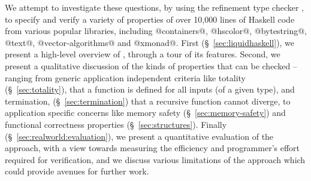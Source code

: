 We attempt to investigate these questions, by using the
refinement type checker \toolname, to specify and verify a variety of 
properties of over 10,000 lines of Haskell code from various popular 
libraries, including @containers@, \hbox{@hscolor@,} @bytestring@, @text@, 
@vector-algorithms@ and @xmonad@. 
%
First (\S~\ref{sec:liquidhaskell}), 
we present a high-level overview of \toolname, through a tour 
of its features.
%
Second, we present a qualitative discussion of the kinds of properties
that can be checked -- ranging from generic application independent 
criteria like totality (\S~\ref{sec:totality}), 
\ie that a function is defined for all inputs (of a given type),  
and termination, 
(\S~\ref{sec:termination}) 
\ie that a recursive function cannot diverge,
to application specific concerns like memory safety (\S~\ref{sec:memory-safety}) 
and functional correctness properties (\S~\ref{sec:structures}).
%
Finally (\S~\ref{sec:realworld:evaluation}), we present a quantitative evaluation of the approach, with a view
towards measuring the efficiency and programmer's effort required for
verification, 
and we discuss various limitations of the approach which could
provide avenues for further work.
